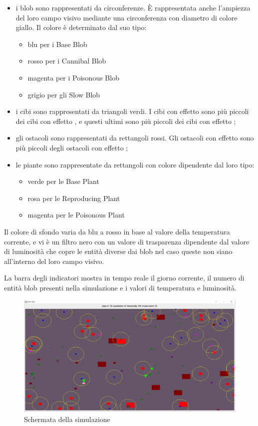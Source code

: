 \begin{itemize}
	\item i blob sono rappresentati da circonferenze. È rappresentata anche l'ampiezza del loro campo visivo mediante una circonferenza con diametro di colore giallo. Il colore è determinato dal suo tipo:
	\begin{itemize}
		\item blu per i Base Blob
		\item rosso per i Cannibal Blob
		\item magenta per i Poisonous Blob
		\item grigio per gli Slow Blob
	\end{itemize}
	\item i cibi sono rappresentati da triangoli verdi. I cibi con effetto  sono più piccoli dei cibi con effetto , e questi ultimi sono più piccoli dei cibi con effetto ;
	\item gli ostacoli sono rappresentati da rettangoli rossi. Gli ostacoli con effetto  sono più piccoli degli ostacoli con effetto ;
	\item le piante sono rappresentate da rettangoli con colore dipendente dal loro tipo:
	\begin{itemize}
		\item verde per le Base Plant
		\item rosa per le Reproducing Plant
		\item magenta per le Poisonous Plant
	\end{itemize}
\end{itemize}

Il colore di sfondo varia da blu a rosso in base al valore della temperatura corrente, e vi è un filtro nero con un valore di trasparenza dipendente dal valore di luminosità che copre le entità diverse dai blob nel caso queste non siano all'interno del loro campo visivo.

La barra degli indicatori mostra in tempo reale il giorno corrente, il numero di entità blob presenti nella simulazione e i valori di temperatura e luminosità.

\begin{figure}[h!]
\centering
\includegraphics[width=\textwidth, scale=0.44]{img/SimulationInterface.png}
\caption{Schermata della simulazione}
\label{fig:SimulationInterface}
\end{figure}

